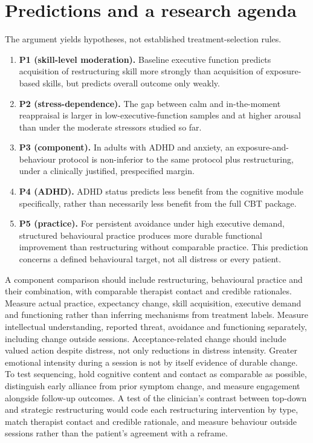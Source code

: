 \section{Predictions and a research agenda}\label{sec:agenda}
The argument yields hypotheses, not established treatment-selection rules.
\begin{enumerate}
\item \textbf{P1 (skill-level moderation).} Baseline executive function predicts acquisition of restructuring skill more strongly than acquisition of exposure-based skills, but predicts overall outcome only weakly.
\item \textbf{P2 (stress-dependence).} The gap between calm and in-the-moment reappraisal is larger in low-executive-function samples and at higher arousal than under the moderate stressors studied so far.
\item \textbf{P3 (component).} In adults with ADHD and anxiety, an exposure-and-behaviour protocol is non-inferior to the same protocol plus restructuring, under a clinically justified, prespecified margin.
\item \textbf{P4 (ADHD).} ADHD status predicts less benefit from the cognitive module specifically, rather than necessarily less benefit from the full CBT package.
\item \textbf{P5 (practice).} For persistent avoidance under high executive demand, structured behavioural practice produces more durable functional improvement than restructuring without comparable practice.
This prediction concerns a defined behavioural target, not all distress or every patient.
\end{enumerate}
A component comparison should include restructuring, behavioural practice and their combination, with comparable therapist contact and credible rationales.
Measure actual practice, expectancy change, skill acquisition, executive demand and functioning rather than inferring mechanisms from treatment labels.
Measure intellectual understanding, reported threat, avoidance and functioning separately, including change outside sessions.
Acceptance-related change should include valued action despite distress, not only reductions in distress intensity.
Greater emotional intensity during a session is not by itself evidence of durable change.
To test sequencing, hold cognitive content and contact as comparable as possible, distinguish early alliance from prior symptom change, and measure engagement alongside follow-up outcomes.
A test of the clinician's contrast between top-down and strategic restructuring would code each restructuring intervention by type, match therapist contact and credible rationale, and measure behaviour outside sessions rather than the patient's agreement with a reframe.
